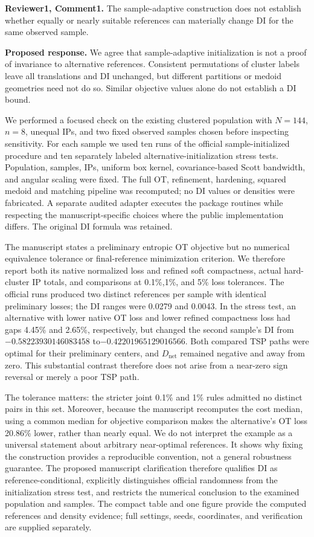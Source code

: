 \noindent\textbf{Reviewer1, Comment1.}
The sample-adaptive construction does not establish whether equally or nearly
suitable references can materially change DI for the same observed sample.

\medskip
\noindent\textbf{Proposed response.}
We agree that sample-adaptive initialization is not a proof of invariance to
alternative references. Consistent permutations of cluster labels leave all
translations and DI unchanged, but different partitions or medoid geometries
need not do so. Similar objective values alone do not establish a DI bound.

We performed a focused check on the existing clustered population with $N=144$,
$n=8$, unequal IPs, and two fixed observed samples chosen before inspecting
sensitivity. For each sample we used ten runs of the official sample-initialized
procedure and ten separately labeled alternative-initialization stress tests.
Population, samples, IPs, uniform box kernel, covariance-based Scott bandwidth,
and angular scaling were fixed. The full OT, refinement, hardening, squared
medoid and matching pipeline was recomputed; no DI values or densities were
fabricated. A separate audited adapter executes the package routines while
respecting the manuscript-specific choices where the public implementation
differs. The original DI formula was retained.

The manuscript states a preliminary entropic OT objective but no numerical
equivalence tolerance or final-reference minimization criterion. We therefore
report both its native normalized loss and refined soft compactness, actual
hard-cluster IP totals, and comparisons at 0.1\%,1\%, and 5\% loss tolerances.
The official runs produced two distinct references per sample with identical
preliminary losses; the DI ranges were 0.0279 and 0.0043. In the stress test, an
alternative with lower native OT loss and lower refined compactness loss had
gaps 4.45\% and 2.65\%, respectively, but changed the second sample's DI from
$-0.58223930146083458$ to$-0.42201965129016566$. Both compared TSP paths were
optimal for their preliminary centers, and $D_{\mathrm{net}}$ remained negative
and away from zero. This substantial contrast therefore does not arise from a
near-zero sign reversal or merely a poor TSP path.

The tolerance matters: the stricter joint 0.1\% and 1\% rules admitted no distinct
pairs in this set. Moreover, because the manuscript recomputes the cost median,
using a common median for objective comparison makes the alternative's OT loss
20.86\% lower, rather than nearly equal. We do not interpret the example as a
universal statement about arbitrary near-optimal references. It shows why fixing
the construction provides a reproducible convention, not a general robustness
guarantee. The proposed manuscript clarification therefore qualifies DI as
reference-conditional, explicitly distinguishes official randomness from the
initialization stress test, and restricts the numerical conclusion to the
examined population and samples. The compact table and one figure provide the
computed references and density evidence; full settings, seeds, coordinates,
and verification are supplied separately.
